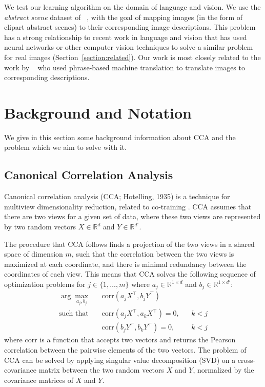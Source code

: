 \documentclass[letterpaper]{article}
\newcommand{\newcite}[1]{\citeauthor{#1}~\shortcite{#1}}
\begin{document}
We test our learning algorithm on the domain of language and vision. We use the
{\em abstract scene} dataset of \newcite{zitnick2013bringing}, with the goal of mapping images (in the form
of clipart abstract scenes) to their corresponding image descriptions. This problem has a strong relationship
to recent work in language and vision that has used neural networks or other computer vision techniques to solve a
similar problem for real images (Section~\ref{section:related}).
Our work is most closely related to the work by \newcite{ortiz2015learning} who used phrase-based machine
translation to translate images to corresponding descriptions.




\section{Background and Notation}


We give in this section some background information about CCA and the problem which we aim to solve with it.

\subsection{Canonical Correlation Analysis}

Canonical correlation analysis (CCA; Hotelling, 1935\nocite{hotelling1935canonical}) is a technique
for multiview dimensionality reduction, related to co-training \cite{blum1998combining}.
CCA assumes that there are two views for a given set of data, where these two views are represented
by two random vectors $X \in \mathbb{R}^d$ and $Y \in \mathbb{R}^{d'}$.

The procedure that CCA
follows finds a projection of the two views in a shared space of dimension $m$, such
that the correlation between the two views is maximized at each
coordinate, and there is minimal redundancy between the coordinates of
each view.  This means that CCA solves the following sequence of
optimization problems for $j \in \{1 ,\ldots, m \}$ where $a_j \in \mathbb{R}^{1
  \times d}$ and $b_j \in \mathbb{R}^{1 \times d'}$:
\begin{align}
\arg\max_{a_j,b_j} &  & \mathrm{corr}(a_j X^{\top}, b_j Y^{\top}) \\
\mbox{such that} & & \mathrm{corr}(a_j X^{\top}, a_k X^{\top}) = 0, & & k < j \\
		 &  & \mathrm{corr}(b_j Y^{\top}, b_k Y^{\top}) = 0, & & k < j
\end{align}
\noindent where $\mathrm{corr}$ is a function that accepts two vectors
and returns the Pearson correlation between the pairwise elements of
the two vectors. The problem of CCA can be solved by applying singular value decomposition
(SVD) on a cross-covariance matrix between the two random vectors $X$
and $Y$, normalized by the covariance matrices of $X$ and $Y$.
\end{document}

